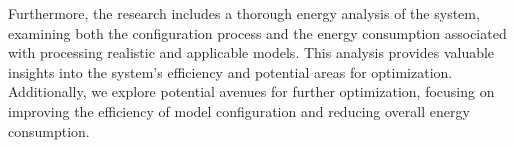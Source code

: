 Furthermore, the research includes a thorough energy analysis of the system, examining both the configuration process and the energy consumption associated with processing realistic and applicable models.
This analysis provides valuable insights into the system's efficiency and potential areas for optimization.
Additionally, we explore potential avenues for further optimization, focusing on improving the efficiency of model configuration and reducing overall energy consumption.

